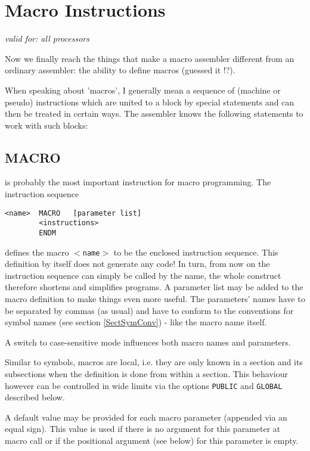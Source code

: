 \documentclass[12pt,twoside]{report}
\makeatletter
\newcommand{\tty}[1]{{\tt #1}}
\newcommand{\ttindex}[1]{\index{#1@{\tt #1}}}
\makeatother
\begin{document}
\section{Macro Instructions}

{\em valid for: all processors}

Now we finally reach the things that make a macro assembler different
from an ordinary assembler: the ability to define macros (guessed
it !?).

When speaking about 'macros', I generally mean a sequence of (machine
or pseudo) instructions which are united to a block by special
statements and can then be treated in certain ways.  The assembler
knows the following statements to work with such blocks:


\subsection{MACRO}
\ttindex{MACRO}\ttindex{ENDM}
\label{SectMacros}

is probably the most important instruction for macro programming.
The instruction sequence
\begin{verbatim}
<name>  MACRO   [parameter list]
        <instructions>
        ENDM
\end{verbatim}
defines the macro \tty{$<$name$>$} to be the enclosed instruction sequence.
This definition by itself does not generate any code!  In turn, from
now on the instruction sequence can simply be called by the name, the
whole construct therefore shortens and simplifies programs.  A
parameter list may be added to the macro definition to make things
even more useful.  The parameters' names have to be separated by
commas (as usual) and have to conform to the conventions for symbol
names (see section \ref{SectSymConv}) - like the macro name itself.

A switch to case-sensitive mode influences both macro names and
parameters.

Similar to symbols, macros are local, i.e. they are only known in a
section and its subsections when the definition is done from within
a section.  This behaviour however can be controlled in wide limits
via the options \tty{PUBLIC} and \tty{GLOBAL} described below.

A default value may be provided for each macro parameter
(appended via an equal sign).  This value is used if there is no
argument for this parameter at macro call or if the positional
argument (see below) for this parameter is empty.
\end{document}

